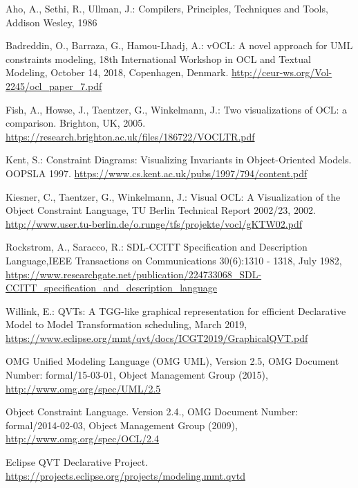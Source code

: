 \documentclass{llncs}
\begin{document}
\begin{thebibliography}{}


Aho, A., Sethi, R., Ullman, J.: Compilers, Principles, Techniques and Tools, Addison Wesley, 1986

Badreddin, O., Barraza, G., Hamou-Lhadj, A.: vOCL: A novel approach for UML constraints modeling, 18th International Workshop in OCL and Textual Modeling, October 14, 2018, Copenhagen, Denmark. \url{http://ceur-ws.org/Vol-2245/ocl\_paper\_7.pdf}

Fish, A., Howse, J., Taentzer, G., Winkelmann, J.: Two visualizations of OCL: a comparison. Brighton, UK, 2005. \url{https://research.brighton.ac.uk/files/186722/VOCLTR.pdf}

Kent, S.: Constraint Diagrams: Visualizing Invariants in Object-Oriented Models. OOPSLA 1997. \url{https://www.cs.kent.ac.uk/pubs/1997/794/content.pdf}

Kiesner, C., Taentzer, G., Winkelmann, J.: Visual OCL: A Visualization of the Object Constraint Language, TU Berlin Technical Report 2002/23, 2002. \url{http://www.user.tu-berlin.de/o.runge/tfs/projekte/vocl/gKTW02.pdf}

Rockstrom, A., Saracco, R.: SDL-CCITT Specification  and  Description  Language,IEEE Transactions on Communications 30(6):1310 - 1318, July 1982, \url{https://www.researchgate.net/publication/224733068\_SDL-CCITT\_specification\_and\_description\_language}

Willink, E.: QVTs: A TGG-like graphical representation for efficient Declarative Model to Model Transformation scheduling, March 2019, \url{https://www.eclipse.org/mmt/qvt/docs/ICGT2019/GraphicalQVT.pdf}

OMG Unified Modeling Language (OMG UML), Version 2.5, {OMG Document Number}: formal/15-03-01, Object Management Group (2015), \url{http://www.omg.org/spec/UML/2.5}

Object Constraint Language. Version 2.4., OMG Document Number: formal/2014-02-03, Object Management Group (2009),  \url{http://www.omg.org/spec/OCL/2.4}

Eclipse QVT Declarative Project.\\
\url{https://projects.eclipse.org/projects/modeling.mmt.qvtd}

\end{thebibliography}
\end{document}
